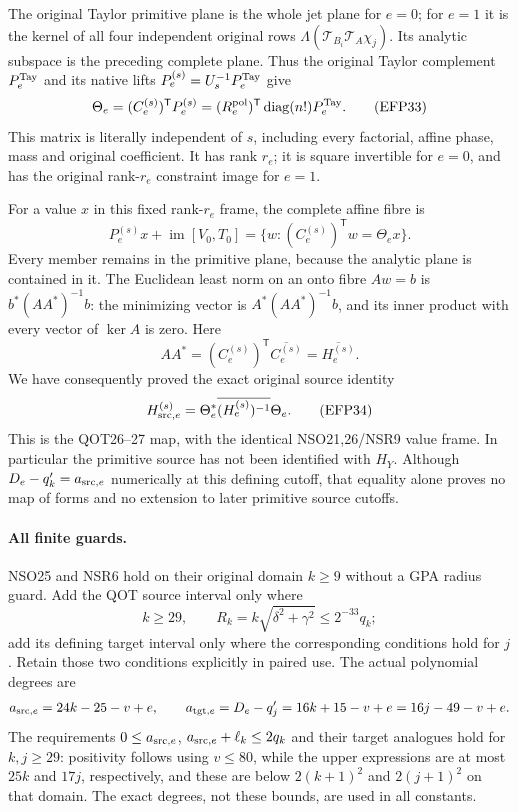 \documentclass[11pt,a4paper]{article}
\begin{document}
The original Taylor primitive plane is the whole jet plane for $e=0$;
for $e=1$ it is the kernel of all four independent original rows
$\Lambda(\mathcal T_{B_i}\mathcal T_A\chi_j)$.
Its analytic subspace is the preceding complete plane.
Thus the original Taylor complement $P_e^{\rm Tay}$ and its native lifts
$P_e^{(s)}=U_s^{-1}P_e^{\rm Tay}$ give
\begin{equation}
 \Theta_e=(C_e^{(s)})^{\mathsf T}P_e^{(s)}
   =(R_e^{\rm pol})^{\mathsf T}
       \operatorname{diag}(n!)P_e^{\rm Tay}.
 \tag{EFP33}
\label{epr:eq:theta}
\end{equation}
This matrix is literally independent of $s$, including every factorial,
affine phase, mass and original coefficient. It has rank $r_e$;
it is square invertible for $e=0$, and has the original rank-$r_e$
constraint image for $e=1$.

For a value $x$ in this fixed rank-$r_e$ frame, the complete affine fibre is
\[
 P_e^{(s)}x+\operatorname{im}[V_0,T_0]
     =\{w:(C_e^{(s)})^{\mathsf T}w=\Theta_ex\}.
\]
Every member remains in the primitive plane, because the analytic plane
is contained in it. The Euclidean least norm on an onto fibre $Aw=b$ is
$b^*(AA^*)^{-1}b$: the minimizing vector is
$A^*(AA^*)^{-1}b$, and its inner product with every vector of $\ker A$
is zero. Here
\[
 AA^*=(C_e^{(s)})^{\mathsf T}\overline{C_e^{(s)}}
       =\overline{H_e^{(s)}}.
\]
We have consequently proved the exact original source identity
\begin{equation}
 H_{{\rm src},e}^{(s)}
   =\Theta_e^*\overline{(H_e^{(s)})^{-1}}\Theta_e .
 \tag{EFP34}
\label{epr:eq:source-map}
\end{equation}
This is the QOT26--27 map, with the identical NSO21,26/NSR9 value frame.
In particular the primitive source has not been identified with $H_Y$.
Although $D_e-q'_k=a_{{\rm src},e}$ numerically at this defining cutoff,
that equality alone proves no map of forms and no extension to later
primitive source cutoffs.

\paragraph{All finite guards.}
NSO25 and NSR6 hold on their original domain $k\ge9$ without a GPA radius
guard. Add the QOT source interval only where
\[
 k\ge29,\qquad R_k=k\sqrt{\delta^2+\gamma^2}\le2^{-33}q_k;
\]
add its defining target interval only where the corresponding conditions
hold for $j$. Retain those two conditions explicitly in paired use.
The actual polynomial degrees are
\[
 a_{{\rm src},e}=24k-25-v+e,\qquad
 a_{{\rm tgt},e}=D_e-q'_j=16k+15-v+e=16j-49-v+e .
\]
The requirements $0\le a_{{\rm src},e}$,
$a_{{\rm src},e}+\ell_k\le2q_k$ and their target analogues hold for
$k,j\ge29$: positivity follows using $v\le80$, while the upper expressions
are at most $25k$ and $17j$, respectively, and these are below
$2(k+1)^2$ and $2(j+1)^2$ on that domain. The exact degrees, not these
bounds, are used in all constants.
\end{document}
